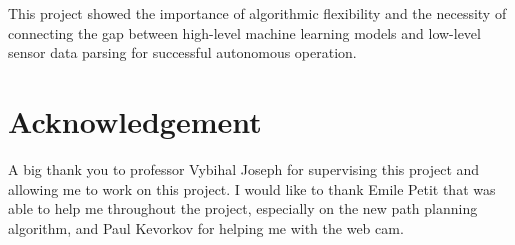 \documentclass{article}
\begin{document}
This project showed the importance of algorithmic flexibility and the necessity of connecting the gap between high-level machine learning models and low-level sensor data parsing for successful autonomous operation.



\section{Acknowledgement}
A big thank you to professor Vybihal Joseph for supervising this project and allowing me to work on this project. I would like to thank Emile Petit that was able to help me throughout the project, especially on the new path planning algorithm, and Paul Kevorkov for helping me with the web cam. 


\printbibliography
\end{document}
